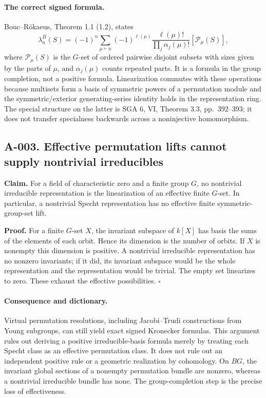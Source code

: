\paragraph{The correct signed formula.}
Bouc--R\"okaeus, Theorem 1.1 (1.2), states
\[
 \lambda_n^B(S)=(-1)^n\sum_{\mu\vdash n}(-1)^{\ell(\mu)}
 \frac{\ell(\mu)!}{\prod_j\alpha_j(\mu)!}[\mathcal P_\mu(S)],
\]
where $\mathcal P_\mu(S)$ is the $G$-set of ordered pairwise disjoint subsets
with sizes given by the parts of $\mu$, and $\alpha_j(\mu)$ counts repeated
parts.  It is a formula in the group completion, not a positive formula.
Linearization commutes with these operations because multisets form a basis
of symmetric powers of a permutation module and the symmetric/exterior
generating-series identity holds in the representation ring.  The special
structure on the latter is SGA 6, VI, Theorem 3.3, pp.~392--393; it does not
transfer specialness backwards across a noninjective homomorphism.

\subsection*{A-003. Effective permutation lifts cannot supply nontrivial irreducibles}
\textbf{Claim.} For a field of characteristic zero and a finite group $G$,
no nontrivial irreducible representation is the linearization of an effective
finite $G$-set.  In particular, a nontrivial Specht representation has no
effective finite symmetric-group-set lift.

\textbf{Proof.} For a finite $G$-set $X$, the invariant subspace of $k[X]$
has basis the sums of the elements of each orbit.  Hence its dimension is
the number of orbits.  If $X$ is nonempty this dimension is positive.  A
nontrivial irreducible representation has no nonzero invariants; if it did,
its invariant subspace would be the whole representation and the
representation would be trivial.  The empty set linearizes to zero.
These exhaust the effective possibilities. \hfill$\square$

\paragraph{Consequence and dictionary.}
Virtual permutation resolutions, including Jacobi--Trudi constructions from
Young subgroups, can still yield exact signed Kronecker formulas.  This
argument rules out deriving a positive irreducible-basis formula merely by
treating each Specht class as an effective permutation class.  It does not
rule out an independent positive rule or a geometric realization by
cohomology.  On $BG$, the invariant global sections of a nonempty
permutation bundle are nonzero, whereas a nontrivial irreducible bundle has
none.  The group-completion step is the precise loss of effectiveness.

